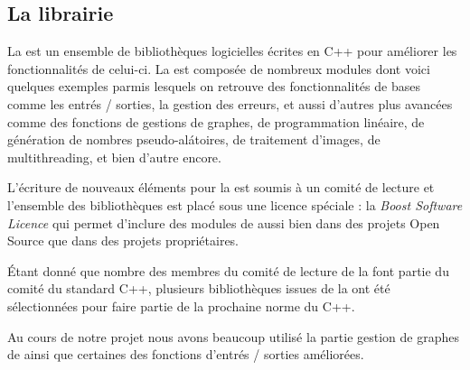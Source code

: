 
%

\subsection{La librairie \boost}

\par
La \boost est un ensemble de biblioth\`eques logicielles \'ecrites en C++ pour am\'eliorer les fonctionnalit\'es de celui-ci. La \boost est compos\'ee de nombreux modules dont voici quelques exemples parmis lesquels on retrouve des fonctionnalit\'es de bases comme les entr\'es / sorties, la gestion des erreurs, et aussi d'autres plus avanc\'ees comme des fonctions de gestions de graphes, de programmation lin\'eaire, de g\'en\'eration de nombres pseudo-al\'atoires, de traitement d'images, de multithreading, et bien d'autre encore.
\par
L'\'ecriture de nouveaux \'el\'ements pour la \boost est soumis \`a un  comit\'e de lecture et l'ensemble des biblioth\`eques est plac\'e sous une licence sp\'eciale : la \textit{Boost Software Licence} qui permet d'inclure des modules de \boost aussi bien dans des projets Open Source que dans des projets propri\'etaires.
\par
\'Etant donn\'e que nombre des membres du comit\'e de lecture de la \boost font partie du comit\'e du standard C++, plusieurs biblioth\`eques issues de la \boost ont \'et\'e s\'electionn\'ees pour faire partie de la prochaine norme du C++.
\par
Au cours de notre projet nous avons beaucoup utilis\'e la partie gestion de graphes de \boost ainsi que certaines des fonctions d'entr\'es / sorties am\'elior\'ees.

%
